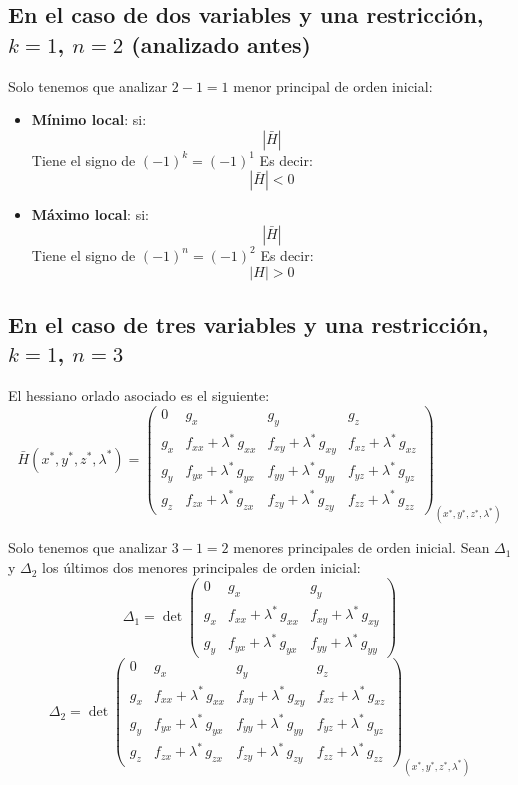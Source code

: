 \documentclass{article}
\begin{document}
\subsection*{En el caso de dos variables y una restricción, $k=1$, $n=2$ (analizado antes)}
Solo tenemos que analizar $2-1=1$ menor principal de orden inicial:
\begin{itemize}
  \item \textbf{Mínimo local}: si:
  \begin{equation*}
   |\bar{H}|
  \end{equation*}
  Tiene el signo de $(-1)^k=(-1)^1$ Es decir:
    \begin{equation*}
   |\bar{H}|<0
  \end{equation*}
  \item \textbf{Máximo local}:  si:
  \begin{equation*}
   |\bar{H}|
  \end{equation*}
  Tiene el signo de $(-1)^n=(-1)^2$ Es decir:
    \begin{equation*}
   |H|>0
  \end{equation*}
\end{itemize}

\subsection*{En el caso de tres variables y una restricción, $k=1$, $n=3$ }
El hessiano orlado asociado es el siguiente:
\[
\bar H(x^*,y^*,z^*,\lambda^*)
=
\begin{pmatrix}
0 & g_x & g_y & g_z \\[4pt]
g_x & f_{xx}+\lambda^*\,g_{xx} & f_{xy}+\lambda^*\,g_{xy} & f_{xz}+\lambda^*\,g_{xz} \\[4pt]
g_y & f_{yx}+\lambda^*\,g_{yx} & f_{yy}+\lambda^*\,g_{yy} & f_{yz}+\lambda^*\,g_{yz} \\[4pt]
g_z & f_{zx}+\lambda^*\,g_{zx} & f_{zy}+\lambda^*\,g_{zy} & f_{zz}+\lambda^*\,g_{zz}
\end{pmatrix}_{(x^*,y^*,z^*,\lambda^*)}
\]



Solo tenemos que analizar $3-1=2$ menores principales de orden inicial. Sean $ \Delta_1$ y $\Delta_2$ los últimos dos menores principales de orden inicial:
 \[
{
\Delta_1
=
\det
\begin{pmatrix}
0 & g_x & g_y \\
g_x & f_{xx}+\lambda^*\,g_{xx} & f_{xy}+\lambda^*\,g_{xy} \\
g_y & f_{yx}+\lambda^*\,g_{yx} & f_{yy}+\lambda^*\,g_{yy}
\end{pmatrix}
}
\]
 \[
{
\Delta_2
=
\det
\begin{pmatrix}
0 & g_x & g_y & g_z \\[4pt]
g_x & f_{xx}+\lambda^*\,g_{xx} & f_{xy}+\lambda^*\,g_{xy} & f_{xz}+\lambda^*\,g_{xz} \\[4pt]
g_y & f_{yx}+\lambda^*\,g_{yx} & f_{yy}+\lambda^*\,g_{yy} & f_{yz}+\lambda^*\,g_{yz} \\[4pt]
g_z & f_{zx}+\lambda^*\,g_{zx} & f_{zy}+\lambda^*\,g_{zy} & f_{zz}+\lambda^*\,g_{zz}
\end{pmatrix}_{(x^*,y^*,z^*,\lambda^*)}
}
\]
\end{document}
